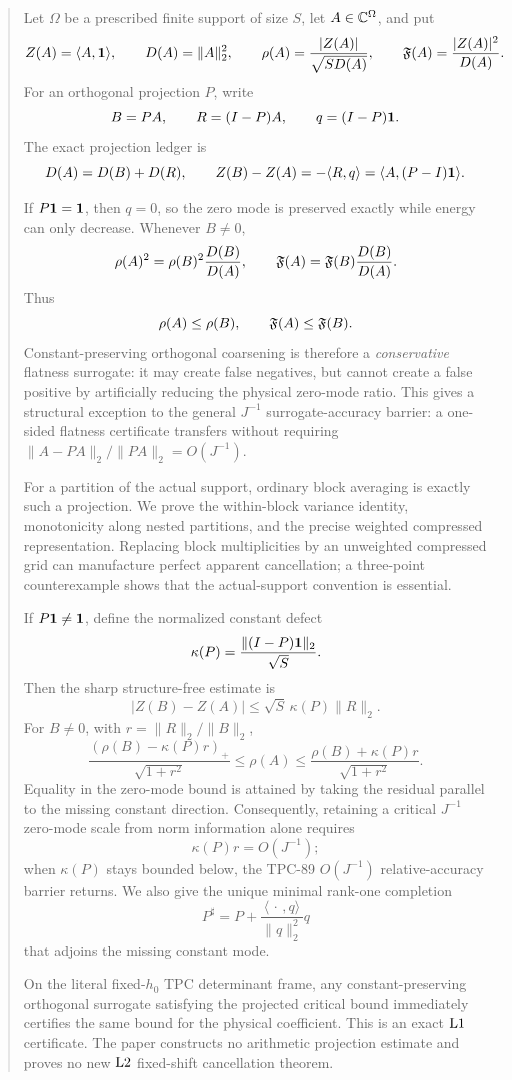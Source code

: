 \begin{abstract}
Let \(\Omega\) be a prescribed finite support of size \(S\), let
\(A\in\C^\Omega\), and put
\[
 Z(A)=\langle A,\one\rangle,\qquad
 D(A)=\|A\|_2^2,\qquad
 \rho(A)=\frac{|Z(A)|}{\sqrt{S D(A)}},\qquad
 \Flat(A)=\frac{|Z(A)|^2}{D(A)}.
\]
For an orthogonal projection \(P\), write
\[
 B=PA,\qquad R=(I-P)A,\qquad
 q=(I-P)\one .
\]
The exact projection ledger is
\[
 D(A)=D(B)+D(R),\qquad
 Z(B)-Z(A)=-\langle R,q\rangle
          =\langle A,(P-I)\one\rangle .
\]

If \(P\one=\one\), then \(q=0\), so the zero mode is preserved
exactly while energy can only decrease.  Whenever \(B\ne0\),
\[
 \rho(A)^2
 =\rho(B)^2\frac{D(B)}{D(A)},\qquad
 \Flat(A)
 =\Flat(B)\frac{D(B)}{D(A)}.
\]
Thus
\[
 \rho(A)\le\rho(B),\qquad
 \Flat(A)\le\Flat(B).
\]
Constant-preserving orthogonal coarsening is therefore a
\emph{conservative} flatness surrogate: it may create false
negatives, but cannot create a false positive by artificially
reducing the physical zero-mode ratio.  This gives a structural
exception to the general \(J^{-1}\) surrogate-accuracy barrier:
a one-sided flatness certificate transfers without requiring
\(\|A-PA\|_2/\|PA\|_2=O(J^{-1})\).

For a partition of the actual support, ordinary block averaging is
exactly such a projection.  We prove the within-block variance
identity, monotonicity along nested partitions, and the precise
weighted compressed representation.  Replacing block multiplicities
by an unweighted compressed grid can manufacture perfect apparent
cancellation; a three-point counterexample shows that the
actual-support convention is essential.

If \(P\one\ne\one\), define the normalized constant defect
\[
 \kappa(P)=\frac{\|(I-P)\one\|_2}{\sqrt S}.
\]
Then the sharp structure-free estimate is
\[
 |Z(B)-Z(A)|
 \le\sqrt S\,\kappa(P)\|R\|_2.
\]
For \(B\ne0\), with \(r=\|R\|_2/\|B\|_2\),
\[
 \frac{(\rho(B)-\kappa(P)r)_+}{\sqrt{1+r^2}}
 \le\rho(A)\le
 \frac{\rho(B)+\kappa(P)r}{\sqrt{1+r^2}}.
\]
Equality in the zero-mode bound is attained by taking the residual
parallel to the missing constant direction.  Consequently, retaining
a critical \(J^{-1}\) zero-mode scale from norm information alone
requires
\[
 \kappa(P)r=O(J^{-1});
\]
when \(\kappa(P)\) stays bounded below, the TPC-89
\(O(J^{-1})\) relative-accuracy barrier returns.  We also give the
unique minimal rank-one completion
\[
 P^\sharp=P+
 \frac{\langle\,\cdot\,,q\rangle}{\|q\|_2^2}q
\]
that adjoins the missing constant mode.

On the literal fixed-\(h_0\) TPC determinant frame, any
constant-preserving orthogonal surrogate satisfying the projected
critical bound immediately certifies the same bound for the physical
coefficient.  This is an exact \(\Lone\) certificate.  The paper
constructs no arithmetic projection estimate and proves no new
\(\Ltwo\) fixed-shift cancellation theorem.
\end{abstract}
